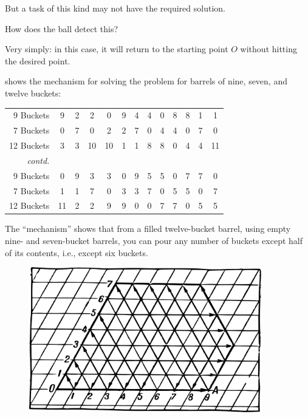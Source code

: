 But a task of this kind may not have the required solution.

How does the ball detect this?

Very simply: in this case, it will return to the starting point $O$ without hitting the desired point.


 shows the mechanism for solving the problem for barrels of nine, seven, and twelve buckets:


\begin{small}
\centering
\begin{center}
\begin{tabular}{@{}r *{12}{c}@{}}
\toprule
9 Buckets & 9  & 2 & 2 & 0 & 9 & 4 & 4 & 0 & 8 & 8 & 1 & 1 \\
7 Buckets & 0 & 7 & 0 & 2 & 2 & 7 & 0 & 4 & 4 & 0 & 7 & 0 \\
12 Buckets & 3 & 3 & 10 & 10 & 1 & 1 & 8  & 8 & 0 & 4 & 4  & 11 \\
\midrule
\emph{contd.}\\
9 Buckets & 0 & 9 & 3 & 3 & 0 & 9 & 5 & 5 & 0 & 7 & 7 & 0 \\
7 Buckets & 1 & 1 & 7 & 0 & 3 & 3 & 7 & 0 & 5 & 5 & 0 & 7\\
12 Buckets & 11 & 2 & 2 & 9 & 9 & 0 & 0  & 7 & 7 & 0 & 5 & 5\\ 
\bottomrule
\end{tabular}
\end{center}
\end{small}


The ``mechanism'' shows that from a filled twelve-bucket barrel, using empty nine- and seven-bucket barrels, you can pour any number of buckets except half of its contents, i.e., except six buckets.


\begin{figure}[h!]
\centering
\includegraphics[width=0.9\textwidth]{figures/ch-10/fig-153.pdf}
\end{figure}

